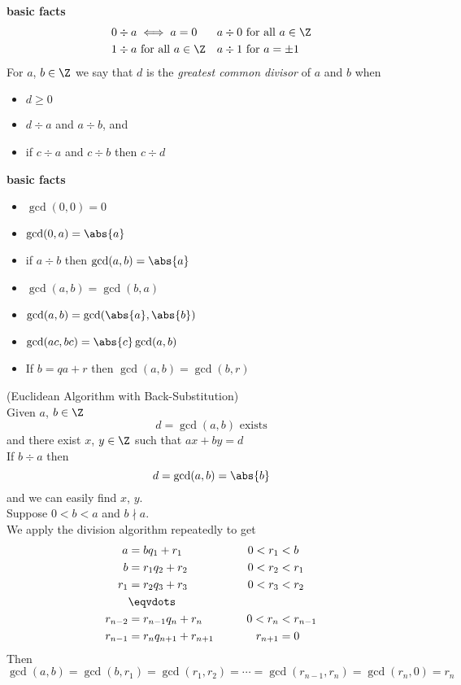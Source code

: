 \textbf{basic facts}
\begin{align*}
& 0\div a\iff a=0 && a\div0\text{ for all $a\in\Z$} \\
& 1\div a\text{ for all $a\in\Z$} && a\div1\text{ for $a=\pm1$}
\end{align*}
 For $a$, $b\in\Z$ we say that $d$ is the \emph{greatest common divisor} of $a$ and $b$ when
\begin{itemize}
\item[] $d\geq0$
\item[] $d\div a$ and $a\div b$, and
\item[] if $c\div a$ and $c\div b$ then $c\div d$
\end{itemize}
\textbf{basic facts}
\begin{itemize}
\item[] $\gcd(0,0)=0$
\item[] $\gcd(0,a)=\abs{a}$
\item[] if $a\div b$ then $\gcd(a,b)=\abs{a}$
\item[] $\gcd(a,b)=\gcd(b,a)$
\item[] $\gcd(a,b)=\gcd(\abs{a},\abs{b})$
\item[] $\gcd(ac,bc)=\abs{c}\gcd(a,b)$
\item[] If $b=qa+r$ then $\gcd(a,b)=\gcd(b,r)$
\end{itemize}
\thm (Euclidean Algorithm with Back-Substitution) \\
Given $a$, $b\in\Z$
\[ d=\gcd(a,b) \text{ exists} \]
and there exist $x$, $y\in\Z$ such that $ax+by=d$ \\
\pf If $b\div a$ then
\[ d=\gcd(a,b)=\abs{b} \]
and we can easily find $x$, $y$. \\
Suppose $0<b<a$ and $b\nmid a$. \\
We apply the division algorithm repeatedly to get
\begin{alignat*}{2}
a &= bq_1 + r_1 &\qquad 0<r_1&<b \\
b &= r_1q_2 + r_2 & 0<r_2&<r_1 \\
r_1 &= r_2q_3 + r_3 & 0<r_3&<r_2 \\
&\eqvdots \\
r_{n-2} &= r_{n-1}q_n + r_n & 0<r_n&<r_{n-1} \\
r_{n-1} &= r_nq_{n+1} + r_{n+1} & r_{n+1} &= 0
\end{alignat*}
Then $\gcd(a,b)=\gcd(b,r_1)=\gcd(r_1,r_2)=\dotsb=\gcd(r_{n-1},r_n)=\gcd(r_n,0)=r_n$

